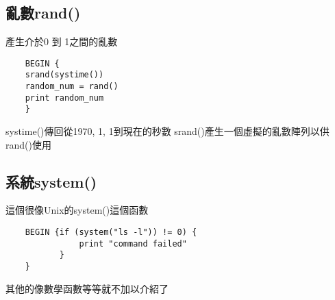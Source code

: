     \subsection{亂數rand()}
    產生介於0 到 1之間的亂數
    \begin{verbatim}
    BEGIN {
    srand(systime())
    random_num = rand()
    print random_num
    }
    \end{verbatim}
    systime()傳回從1970, 1, 1到現在的秒數 srand()產生一個虛擬的亂數陣列以供
    rand()使用
    \subsection{系統system()}
    這個很像Unix的system()這個函數
    \begin{verbatim}
    BEGIN {if (system("ls -l")) != 0) {
               print "command failed"
           }
    }
    \end{verbatim}
    其他的像數學函數等等就不加以介紹了

